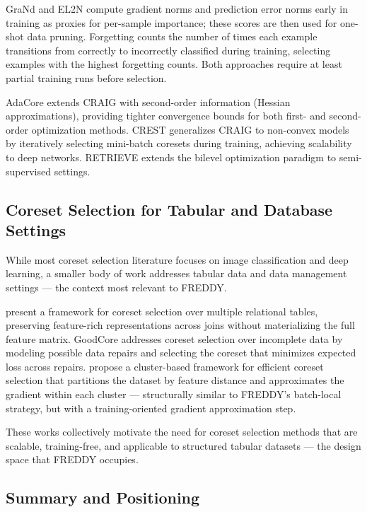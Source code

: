 \documentclass{article}
\begin{document}
GraNd and EL2N \cite{Paul2021Deep} compute gradient norms and prediction error norms early in training as proxies for per-sample importance; these scores are then used for one-shot data pruning.
Forgetting \cite{Toneva2019Forgetting} counts the number of times each example transitions from correctly to incorrectly classified during training, selecting examples with the highest forgetting counts.
Both approaches require at least partial training runs before selection.

AdaCore \cite{Pooladzandi2022AdaCore} extends CRAIG with second-order information (Hessian approximations), providing tighter convergence bounds for both first- and second-order optimization methods.
CREST \cite{Yang2023Towards} generalizes CRAIG to non-convex models by iteratively selecting mini-batch coresets during training, achieving scalability to deep networks.
RETRIEVE \cite{Killamsetty2021Retrieve} extends the bilevel optimization paradigm to semi-supervised settings.

\subsection{Coreset Selection for Tabular and Database Settings}

While most coreset selection literature focuses on image classification and deep learning, a smaller body of work addresses tabular data and data management settings — the context most relevant to FREDDY.

\cite{Wang2022Coresets} present a framework for coreset selection over multiple relational tables, preserving feature-rich representations across joins without materializing the full feature matrix.
GoodCore \cite{Chai2023GoodCore} addresses coreset selection over incomplete data by modeling possible data repairs and selecting the coreset that minimizes expected loss across repairs.
\cite{chai2023efficient} propose a cluster-based framework for efficient coreset selection that partitions the dataset by feature distance and approximates the gradient within each cluster — structurally similar to FREDDY's batch-local strategy, but with a training-oriented gradient approximation step.

These works collectively motivate the need for coreset selection methods that are scalable, training-free, and applicable to structured tabular datasets — the design space that FREDDY occupies.

\subsection{Summary and Positioning}
\end{document}
